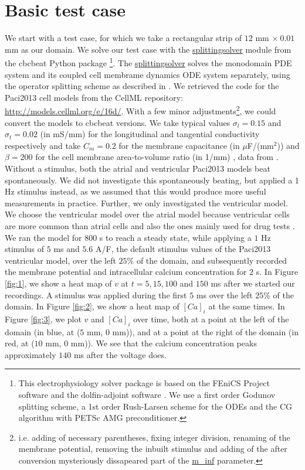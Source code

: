 \documentclass[12pt,a4paper]{article}
\begin{document}
\section{Basic test case} \label{Basic test case}
We start with a test case, for which we take a rectangular strip of $12$ mm $\times\: 0.01$ mm as our domain. We solve our test case with the \url{splittingsolver} module from the cbcbeat Python package \cite{cbcbeat}\footnote{This electrophysiology solver package is based on the FEniCS Project software \cite{fenics} and the dolfin-adjoint software \cite{dolfin-adjoint}. We use a first order Godunov splitting scheme, a 1st order Rush-Larsen scheme for the ODEs and the CG algorithm with PETSc AMG preconditioner.}. The \url{splittingsolver} solves the monodomain PDE system and its coupled cell membrame dynamics ODE system separately, using the operator splitting scheme as described in \cite{Sundnes}. We retrieved the code for the Paci2013 cell models from the CellML repository: \url{http://models.cellml.org/e/16d/}. With a few minor adjustments\footnote{i.e. adding of necessary parentheses, fixing integer division, renaming of the membrane potential, removing the inbuilt stimulus and adding of the after conversion mysteriously dissapeared part of the \url{m_inf} parameter.}, we could convert the models to cbcbeat versions.  We take typical values $\sigma_l=0.15$ and $\sigma_t=0.02$ (in mS/mm) for the longitudinal and tangential conductivity respectively and take $C_m=0.2$ for the membrane capacitance (in $\mu$F/(mm$^2$)) and $\beta=200$ for the cell membrane area-to-volume ratio (in 1/mm) \cite{Roth}, data from \cite{Plonsey1882, Plonsey1984}. Without a stimulus, both the atrial and ventricular Paci2013 models beat spontaneously. We did not investigate this spontaneously beating, but applied a 1 Hz stimulus instead, as we assumed that this would produce more useful measurements in practice. Further, we only investigated the ventricular model. We choose the ventricular model over the atrial model because ventricular cells are more common than atrial cells and also the ones mainly used for drug tests \cite{Paci2015}.
We ran the model for 800 s to reach a steady state, while applying a $1$ Hz stimulus of $5$ ms and $5.6$ A/F, the default stimulus values of the Paci2013 ventricular model, over the left $25\%$ of the domain, and subsequently recorded the membrane potential and intracellular calcium concentration for $2$ s. In Figure \ref{fig:1}, we show a heat map of $v$ at $t=5, 15, 100$ and $150$ ms after we started our recordings. A stimulus was applied during the first $5$ ms over the left $25\%$ of the domain. In Figure \ref{fig:2}, we show a heat map of $[Ca]_i$ at the same times. In Figure \ref{fig:3}, we plot $v$ and $[Ca]_i$ over time, both at a point at the left of the domain (in blue, at ($5$ mm, $0$ mm)), and at a point at the right of the domain (in red, at ($10$ mm, $0$ mm)). We see that the calcium concentration peaks approximately $140$ ms after the voltage does. 
\end{document}
